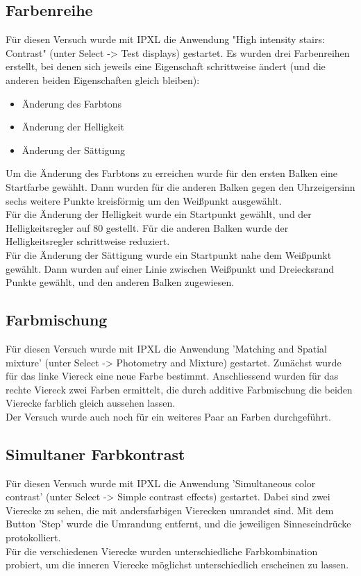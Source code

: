 \documentclass[a4paper]{article}
\begin{document}
\subsection{Farbenreihe}
Für diesen Versuch wurde mit IPXL die Anwendung "High intensity stairs: Contrast" (unter Select -> Test displays) gestartet. Es wurden drei Farbenreihen erstellt, bei denen sich jeweils eine Eigenschaft schrittweise ändert (und die anderen beiden Eigenschaften gleich bleiben):
\begin{itemize}
    \item Änderung des Farbtons
    \item Änderung der Helligkeit
    \item Änderung der Sättigung
\end{itemize}
Um die Änderung des Farbtons zu erreichen wurde für den ersten Balken eine Startfarbe gewählt. Dann wurden für die anderen Balken gegen den Uhrzeigersinn sechs weitere Punkte kreisförmig um den Weißpunkt ausgewählt.\\
Für die Änderung der Helligkeit wurde ein Startpunkt gewählt, und der Helligkeitsregler auf 80 gestellt. Für die anderen Balken wurde der Helligkeitsregler schrittweise reduziert.\\
Für die Änderung der Sättigung wurde ein Startpunkt nahe dem Weißpunkt gewählt. Dann wurden auf einer Linie zwischen Weißpunkt und Dreiecksrand Punkte gewählt, und den anderen Balken zugewiesen.

\subsection{Farbmischung}
Für diesen Versuch wurde mit IPXL die Anwendung 'Matching and Spatial mixture' (unter Select -> Photometry and Mixture) gestartet. Zunächst wurde für das linke Viereck eine neue Farbe bestimmt. Anschliessend wurden für das rechte Viereck zwei Farben ermittelt, die durch additive Farbmischung die beiden Vierecke farblich gleich aussehen lassen.\\
Der Versuch wurde auch noch für ein weiteres Paar an Farben durchgeführt.

\subsection{Simultaner Farbkontrast}
Für diesen Versuch wurde mit IPXL die Anwendung 'Simultaneous color contrast' (unter Select -> Simple contrast effects) gestartet. Dabei sind zwei Vierecke zu sehen, die mit andersfarbigen Vierecken umrandet sind.  Mit dem Button 'Step' wurde die Umrandung entfernt, und die jeweiligen Sinneseindrücke protokolliert.\\
Für die verschiedenen Vierecke wurden unterschiedliche Farbkombination probiert, um die inneren Vierecke möglichst unterschiedlich erscheinen zu lassen.
\end{document}
